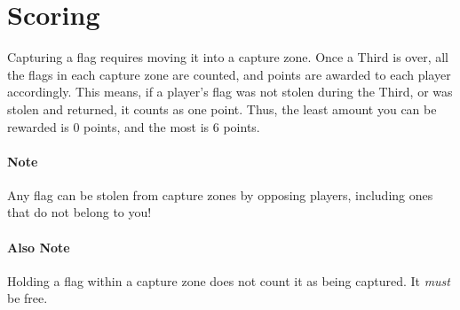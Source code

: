\section{Scoring} \label{scoring}
Capturing a flag requires moving it into a capture zone.
Once a Third is over, all the flags in each capture zone are counted, and points are awarded to each player accordingly.
This means, if a player's flag was not stolen during the Third, or was stolen and returned, it counts as one point.
Thus, the least amount you can be rewarded is 0 points, and the most is 6 points.

\paragraph{Note} Any flag can be stolen from capture zones by opposing players, including ones that do not belong to you!

\paragraph{Also Note} Holding a flag within a capture zone does not count it as being captured. It \textit{must} be free.
